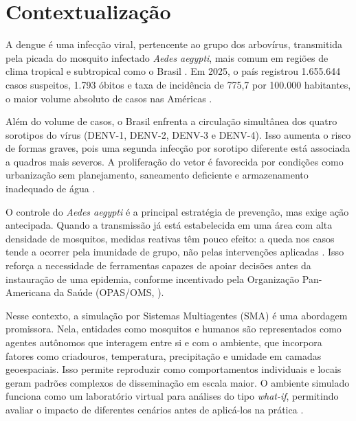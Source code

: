 \section{Contextualização}
\label{1-contextualizacao}


A dengue é uma infecção viral, pertencente ao grupo dos arbovírus, transmitida pela picada 
do mosquito infectado \textit{Aedes aegypti}, mais comum em regiões de clima tropical e subtropical como o Brasil \cite{ministerio2026}.
Em 2025, o país registrou 1.655.644 casos suspeitos, 1.793 óbitos e taxa de incidência de
775,7 por 100.000 habitantes, o maior volume absoluto de casos nas Américas .

Além do volume de casos, o Brasil enfrenta a circulação simultânea dos quatro
sorotipos do vírus (DENV-1, DENV-2, DENV-3 e DENV-4). Isso aumenta o risco de formas graves, pois
uma segunda infecção por sorotipo diferente está associada a quadros mais severos. A
proliferação do vetor é favorecida por condições como urbanização sem planejamento,
saneamento deficiente e armazenamento inadequado de água \cite{who2025}.

O controle do \textit{Aedes aegypti} é a principal estratégia de prevenção, mas exige ação
antecipada. Quando a transmissão já está estabelecida em uma área com alta densidade
de mosquitos, medidas reativas têm pouco efeito: a queda nos casos tende a ocorrer pela
imunidade de grupo, não pelas intervenções aplicadas \cite{ministerio2026}.
Isso reforça a necessidade de ferramentas capazes de apoiar decisões antes da instauração
de uma epidemia, conforme incentivado pela Organização Pan-Americana da Saúde
(OPAS/OMS, \citeyear{opas2026}).

Nesse contexto, a simulação por Sistemas Multiagentes (SMA) é uma abordagem
promissora. Nela, entidades como mosquitos e humanos são representados como agentes
autônomos que interagem entre si e com o ambiente, que incorpora fatores como
criadouros, temperatura, precipitação e umidade em camadas geoespaciais. Isso permite
reproduzir como comportamentos individuais e locais geram padrões complexos de disseminação
em escala maior. O ambiente simulado funciona como um laboratório virtual
para análises do tipo \textit{what-if}, permitindo avaliar o impacto de diferentes cenários antes
de aplicá-los na prática \cite{pascoe2023}.


